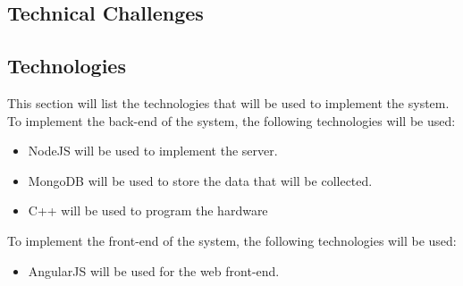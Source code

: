 \documentclass{scrartcl}
\begin{document}
\subsection{Technical Challenges}
\subsection{Technologies}
This section will list the technologies that will be used to implement the system.\\
To implement the back-end of the system, the following technologies will be used:
\begin{itemize}
    \item NodeJS will be used to implement the server.
    \item MongoDB will be used to store the data that will be collected.
    \item C++ will be used to program the hardware
\end{itemize}
To implement the front-end of the system, the following technologies will be used:
\begin{itemize}
    \item AngularJS will be used for the web front-end.
\end{itemize}
\end{document}
